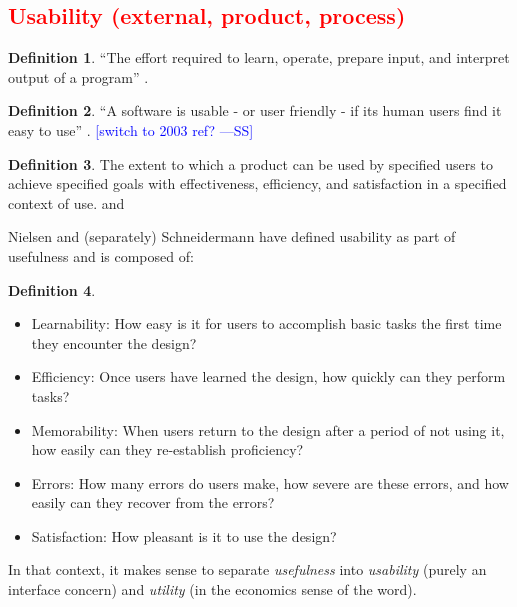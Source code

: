 \documentclass[letterpaper, cleveref]{lipics-v2019}
\newcommand{\authornote}[3]{\textcolor{#1}{[#3 ---#2]}}
\newcommand{\authornote}[3]{}
\newcommand{\wss}[1]{\authornote{blue}{SS}{#1}} %
\newcommand{\jc}[1]{\authornote{red}{JC}{#1}} %
\newcommand{\notdone}[1]{\textcolor{red}{#1}}
\theoremstyle{definition}
\newtheorem{defn}{Definition}
\begin{document}

\subsection{\notdone{Usability (external, product, process)}} %

\begin{defn}
  ``The effort required to learn, operate, prepare input, and interpret output
  of a program'' \citep{McCallEtAl1977}.
\end{defn}

\begin{defn}
  ``A software is usable - or user friendly - if its human users find it easy
  to use'' \citep{ghezzi1991fundamentals}. \wss{switch to 2003 ref?}
\end{defn}

\begin{defn}
  The extent to which a product can be used by specified users to achieve
  specified goals with effectiveness, efficiency, and satisfaction in a
  specified context of use. \cite{ISO16982:2002} and \cite{ISO9241:11}
\end{defn}

Nielsen and (separately) Schneidermann have defined usability as part of
usefulness and is composed of:
\begin{defn}
\begin{itemize}
\item Learnability: How easy is it for users to accomplish basic tasks the first
  time they encounter the design?
\item Efficiency: Once users have learned the design, how quickly can they
  perform tasks?
\item Memorability: When users return to the design after a period of not using
  it, how easily can they re-establish proficiency?
\item Errors: How many errors do users make, how severe are these errors, and
  how easily can they recover from the errors?
\item Satisfaction: How pleasant is it to use the design?
\end{itemize}
In that context, it makes sense to separate \emph{usefulness} into
\emph{usability} (purely an interface concern) and \emph{utility} (in the
economics sense of the word).
\cite{NielsenNorman} %
\end{defn}
\end{document}
